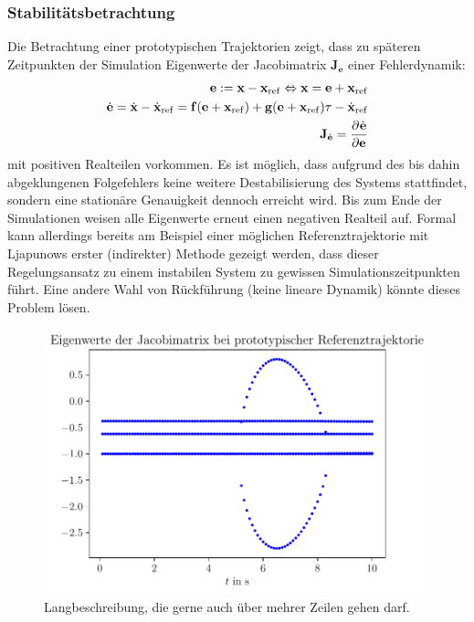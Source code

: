 \subsubsection{Stabilitätsbetrachtung}
Die Betrachtung einer prototypischen Trajektorien zeigt, dass zu späteren Zeitpunkten der Simulation Eigenwerte der Jacobimatrix $\mathbf{J}_{\dot{\mathbf{e}}}$ einer Fehlerdynamik:
\begin{align}
	\mathbf{e} := \mathbf{x} - \mathbf{x}_{\mathrm{ref}} \Leftrightarrow \mathbf{x} = \mathbf{e} + \mathbf{x}_{\mathrm{ref}} \\
	\dot{\mathbf{e}} = \dot{\mathbf{x}} - \dot{\mathbf{x}}_{\mathrm{ref}} = \mathbf{f}(\mathbf{e} + \mathbf{x}_{\mathrm{ref}}) + \mathbf{g}(\mathbf{e} + \mathbf{x}_{\mathrm{ref}}) \mathbf{\tau} - \dot{\mathbf{x}}_{\mathrm{ref}} \\
	\mathbf{J}_{\dot{\mathbf{e}}} = \frac{\partial^{}\dot{\mathbf{e}}}{\partial{\mathbf{e}}^{}}
\end{align}
mit positiven Realteilen vorkommen. Es ist möglich, dass aufgrund des bis dahin abgeklungenen Folgefehlers keine weitere Destabilisierung des Systems stattfindet, sondern eine stationäre Genauigkeit dennoch erreicht wird. Bis zum Ende der Simulationen weisen alle Eigenwerte erneut einen negativen Realteil auf. Formal kann allerdings bereits am Beispiel einer möglichen Referenztrajektorie mit Ljapunows erster (indirekter) Methode gezeigt werden, dass dieser Regelungsansatz zu einem instabilen System zu gewissen Simulationszeitpunkten führt. Eine andere Wahl von Rückführung (keine lineare Dynamik) könnte dieses Problem lösen.

\begin{figure}[ht]
	\begin{center}
		\includegraphics[scale=1]{Pictures/feedforward_lin_selec_ljapunov1}
	\end{center}
	\caption[Kurzbeschreibung für Abbildungsverzeichnis]
	{Langbeschreibung, die gerne auch über mehrer Zeilen gehen darf.}
	\label{fig_feedforward_selec_controller_ljapunov1}
\end{figure}

